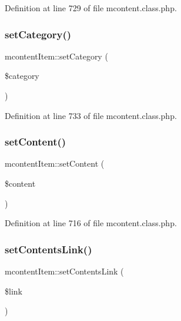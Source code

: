 Definition at line 729 of file mcontent.\+class.\+php.

\hypertarget{classmcontentItem_a004c63ef8da549d29d201b4946372c5e}{}\label{classmcontentItem_a004c63ef8da549d29d201b4946372c5e} 
\subsubsection{\texorpdfstring{set\+Category()}{setCategory()}}
{\footnotesize\ttfamily mcontent\+Item\+::set\+Category (\begin{DoxyParamCaption}\item[{}]{\$category }\end{DoxyParamCaption})}



Definition at line 733 of file mcontent.\+class.\+php.

\hypertarget{classmcontentItem_afb9763a013942bd40ab5a3b1c7491910}{}\label{classmcontentItem_afb9763a013942bd40ab5a3b1c7491910} 
\subsubsection{\texorpdfstring{set\+Content()}{setContent()}}
{\footnotesize\ttfamily mcontent\+Item\+::set\+Content (\begin{DoxyParamCaption}\item[{}]{\$content }\end{DoxyParamCaption})}



Definition at line 716 of file mcontent.\+class.\+php.

\hypertarget{classmcontentItem_a8d8267fc8c63ad032d8dfa694b54d30b}{}\label{classmcontentItem_a8d8267fc8c63ad032d8dfa694b54d30b} 
\subsubsection{\texorpdfstring{set\+Contents\+Link()}{setContentsLink()}}
{\footnotesize\ttfamily mcontent\+Item\+::set\+Contents\+Link (\begin{DoxyParamCaption}\item[{}]{\$link }\end{DoxyParamCaption})}



